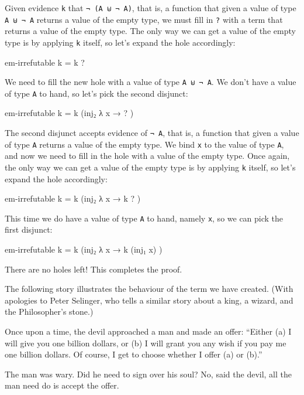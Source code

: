 Given evidence \texttt{k} that \texttt{¬\ (A\ ⊎\ ¬\ A)}, that is, a
function that given a value of type \texttt{A\ ⊎\ ¬\ A} returns a value
of the empty type, we must fill in \texttt{?} with a term that returns a
value of the empty type. The only way we can get a value of the empty
type is by applying \texttt{k} itself, so let's expand the hole
accordingly:

\begin{myDisplay}
em-irrefutable k = k ?
\end{myDisplay}

We need to fill the new hole with a value of type \texttt{A\ ⊎\ ¬\ A}.
We don't have a value of type \texttt{A} to hand, so let's pick the
second disjunct:

\begin{myDisplay}
em-irrefutable k = k (inj₂ λ{ x → ? })
\end{myDisplay}

The second disjunct accepts evidence of \texttt{¬\ A}, that is, a
function that given a value of type \texttt{A} returns a value of the
empty type. We bind \texttt{x} to the value of type \texttt{A}, and now
we need to fill in the hole with a value of the empty type. Once again,
the only way we can get a value of the empty type is by applying
\texttt{k} itself, so let's expand the hole accordingly:

\begin{myDisplay}
em-irrefutable k = k (inj₂ λ{ x → k ? })
\end{myDisplay}

This time we do have a value of type \texttt{A} to hand, namely
\texttt{x}, so we can pick the first disjunct:

\begin{myDisplay}
em-irrefutable k = k (inj₂ λ{ x → k (inj₁ x) })
\end{myDisplay}

There are no holes left! This completes the proof.

The following story illustrates the behaviour of the term we have
created. (With apologies to Peter Selinger, who tells a similar story
about a king, a wizard, and the Philosopher's stone.)

Once upon a time, the devil approached a man and made an offer: ``Either
(a) I will give you one billion dollars, or (b) I will grant you any
wish if you pay me one billion dollars. Of course, I get to choose
whether I offer (a) or (b).''

The man was wary. Did he need to sign over his soul? No, said the devil,
all the man need do is accept the offer.

